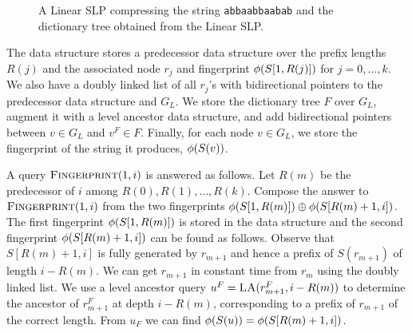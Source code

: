 \documentclass[11pt]{article}
\newcommand{\fingerprintq}{\ensuremath{\textsc{Fingerprint}}}
\newcommand{\levelanc}{\ensuremath{\textsc{LA}}}
\newcommand{\fp}{\ensuremath\phi}
\newcommand{\fpplus}{\ensuremath{\oplus}}
\newcommand{\lslp}{\ensuremath{G_L} }
\begin{document}
\begin{figure}[tb]
\begin{center}
{	
}

\caption{A Linear SLP compressing the string \texttt{abbaabbaabab} and the dictionary tree obtained from the Linear SLP.}\label{fig:linslpex1}

\end{center}
\end{figure}

The data structure stores a predecessor data structure over the prefix lengths $R(j)$ and the associated node $r_j$ and fingerprint $\fp(S[1, R(j)])$ for $j = 0, \ldots, k$. We also have a doubly linked list of all $r_j$'s with bidirectional pointers to the predecessor data structure and $\lslp$.  We store the dictionary tree $F$ over $\lslp$, augment it with a level ancestor data structure, and add bidirectional pointers between $v \in \lslp$ and $v^F \in F$. Finally, for each node $v \in \lslp$, we store the fingerprint of the string it produces, $\fp(S(v))$. 

A query $\fingerprintq(1, i)$ is answered as follows. Let $R(m)$ be the predecessor of $i$ among $R(0), R(1), \ldots, R(k)$. Compose the answer to $\fingerprintq(1, i)$ from the two fingerprints $\fp(S[1, R(m)])\fpplus\fp(S[R(m)+1, i])$. The first fingerprint $\fp(S[1, R(m)])$ is stored in the data structure and the second fingerprint $\fp(S[R(m)+1, i])$ can be found as follows. Observe that $S[R(m)+1, i]$ is fully generated by $r_{m+1}$ and hence a prefix of $S(r_{m+1})$ of length $i-R(m)$. We can get $r_{m+1}$ in constant time from $r_m$ using the doubly linked list. We use a level ancestor query $u^F = \levelanc(r_{m+1}^F, i-R(m))$ to determine the ancestor of $r_{m+1}^F$ at depth $i-R(m)$, corresponding to a prefix of $r_{m+1}$ of the correct length. From $u_F$ we can find $\fp(S(u)) = \fp(S[R(m)+1, i])$.
\end{document}
